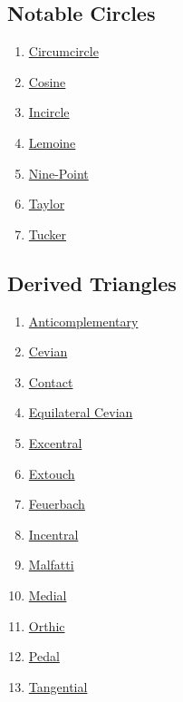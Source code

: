 \documentclass[]{article}
\providecommand{\tightlist}{%
  \setlength{\itemsep}{0pt}\setlength{\parskip}{0pt}}
\begin{document}
\hypertarget{notable-circles}{%
\subsection{Notable Circles}\label{notable-circles}}

\begin{enumerate}
\def\labelenumi{\arabic{enumi}.}
\tightlist
\item
  \href{http://mathworld.wolfram.com/Circumcircle.html}{Circumcircle}
\item
  \href{http://mathworld.wolfram.com/CosineCircle.html}{Cosine}
\item
  \href{http://mathworld.wolfram.com/Incircle.html}{Incircle}
\item
  \href{http://mathworld.wolfram.com/FirstLemoineCircle.html}{Lemoine}
\item
  \href{http://mathworld.wolfram.com/Nine-PointCircle.html}{Nine-Point}
\item
  \href{http://mathworld.wolfram.com/TaylorCircle.html}{Taylor}
\item
  \href{http://mathworld.wolfram.com/TuckerCircles.html}{Tucker}
\end{enumerate}

\hypertarget{derived-triangles}{%
\subsection{Derived Triangles}\label{derived-triangles}}

\begin{enumerate}
\def\labelenumi{\arabic{enumi}.}
\tightlist
\item
  \href{http://mathworld.wolfram.com/AnticomplementaryTriangle.html}{Anticomplementary}
\item
  \href{http://mathworld.wolfram.com/CevianTriangle.html}{Cevian}
\item
  \href{http://mathworld.wolfram.com/ContactTriangle.html}{Contact}
\item
  \href{http://mathworld.wolfram.com/EquilateralCevianTrianglePoint.html}{Equilateral Cevian}
\item
  \href{http://mathworld.wolfram.com/ExcentralTriangle.html}{Excentral}
\item
  \href{http://mathworld.wolfram.com/ExtouchTriangle.html}{Extouch}
\item
  \href{http://mathworld.wolfram.com/FeuerbachTriangle.html}{Feuerbach}
\item
  \href{http://mathworld.wolfram.com/IncentralTriangle.html}{Incentral}
\item
  \href{http://mathworld.wolfram.com/MalfattiTriangle.html}{Malfatti}
\item
  \href{http://mathworld.wolfram.com/MedialTriangle.html}{Medial}
\item
  \href{http://mathworld.wolfram.com/OrthicTriangle.html}{Orthic}
\item
  \href{http://mathworld.wolfram.com/PedalTriangle.html}{Pedal}
\item
  \href{http://mathworld.wolfram.com/TangentialTriangle.html}{Tangential}
\end{enumerate}
\end{document}
